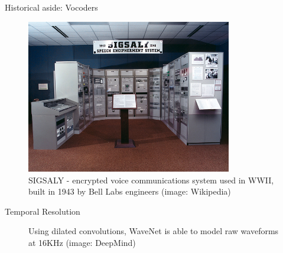 \documentclass{beamer}
\begin{document}
\begin{frame}{Historical aside: Vocoders}
  \begin{figure}
    \includegraphics[width=0.8\textwidth]{img/sigsaly.jpg}
    \caption{SIGSALY - encrypted voice communications system used in WWII, built in 1943 by Bell Labs engineers (image: Wikipedia)}
  \end{figure}
\end{frame}


    \begin{frame}{Temporal Resolution}
      \begin{figure}
      \caption{Using dilated convolutions, WaveNet is able to model raw waveforms at 16KHz (image: DeepMind)}
    \end{figure}
    \end{frame}
\end{document}
